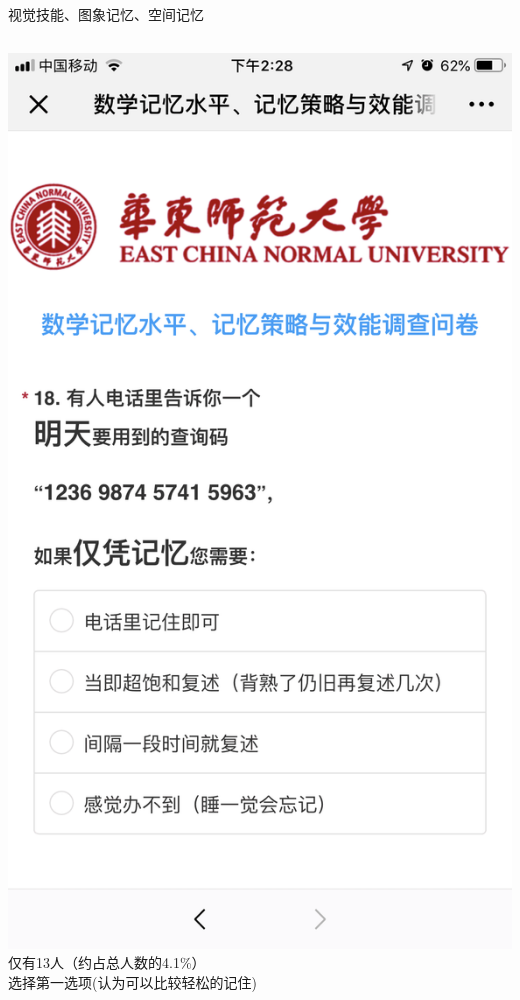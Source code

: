 \documentclass[serif]{beamer}
\begin{document}
    \begin{frame}{视觉技能、图象记忆、空间记忆}
    \begin{columns}
    	\includegraphics[scale=0.08]{test18.png}\\
    	\scriptsize{仅有13人（约占总人数的4.1\%）}\\
    	\scriptsize{选择第一选项(认为可以比较轻松的记住)}

\end{columns}
\end{frame}
\end{document}
